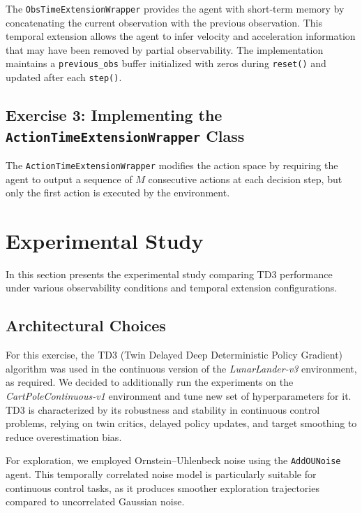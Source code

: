 \documentclass[12pt, a4paper]{article}
\begin{document}
The \texttt{ObsTimeExtensionWrapper} provides the agent with short-term memory by concatenating the current observation with the previous observation. This temporal extension allows the agent to infer velocity and acceleration information that may have been removed by partial observability. The implementation maintains a \texttt{previous\_obs} buffer initialized with zeros during \texttt{reset()} and updated after each \texttt{step()}. 

\subsection{Exercise 3: Implementing the \texttt{ActionTimeExtensionWrapper} Class}

The \texttt{ActionTimeExtensionWrapper} modifies the action space by requiring the agent to output a sequence of $M$ consecutive actions at each decision step, but only the first action is executed by the environment. 



\section{Experimental Study}

In this section presents the experimental study comparing TD3 performance under various observability conditions and temporal extension configurations.

\subsection{Architectural Choices}

For this exercise, the TD3 (Twin Delayed Deep Deterministic Policy Gradient) algorithm was used in the continuous version of the \textit{LunarLander-v3} environment, as required. We decided to additionally run the experiments on the \textit{CartPoleContinuous-v1} environment and tune new set of hyperparameters for it. TD3 is characterized by its robustness and stability in continuous control problems, relying on twin critics, delayed policy updates, and target smoothing to reduce overestimation bias.\newline

For exploration, we employed Ornstein–Uhlenbeck noise using the \texttt{AddOUNoise} agent. This temporally correlated noise model is particularly suitable for continuous control tasks, as it produces smoother exploration trajectories compared to uncorrelated Gaussian noise. \newline
\end{document}

